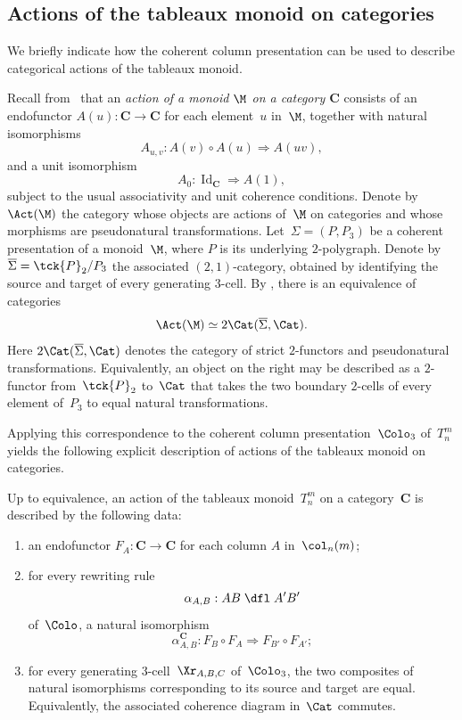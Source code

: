 \documentclass[a4paper, twoside, 11pt, english]{article}
\begin{document}
\subsection{Actions of the tableaux monoid on categories}
\label{SS:Actions}

We briefly indicate how the coherent column presentation can be used to
describe categorical actions of the tableaux monoid.

Recall from~\cite{GaussentGuiraudMalbos15} that an \emph{action of a monoid $\M$ on a category $\mathbf{C}$} consists of an endofunctor $A(u):\mathbf{C}\to\mathbf{C}$ for each element~$u$ in~$\M$, together with natural isomorphisms 
\[ 
A_{u,v}:A(v)\circ A(u)\Rightarrow A(uv), 
\] 
and a unit isomorphism
\[
A_0:\operatorname{Id}_{\mathbf C}\Rightarrow A(1),
\]
subject to the usual associativity and unit coherence conditions. Denote by~$\Act(\M)$ the category whose objects are actions
of~$\M$ on categories and whose morphisms are pseudonatural
transformations.
Let~$\Sigma=(P,P_3)$ be a coherent presentation of a monoid~$\M$, where
$P$ is its underlying $2$-polygraph. Denote by~$\overline{\Sigma}=\tck{P}_2/P_3$
the associated $(2,1)$-category, obtained by identifying the source and
target of every generating $3$-cell. By
\cite[Theorem~5.1.6]{GaussentGuiraudMalbos15}, there is an equivalence
of categories
\[
\Act(\M)\simeq 2\Cat(\overline{\Sigma},\Cat).
\]
Here $2\Cat(\overline{\Sigma},\Cat)$ denotes the category of strict $2$-functors and pseudonatural transformations.
Equivalently, an object on the right may be described as a $2$-functor
from~$\tck{P}_2$ to~$\Cat$ that takes the two boundary $2$-cells of every
element of~$P_3$ to equal natural transformations.

Applying this correspondence to the coherent column presentation~$\Colo_3$ of~$T_n^m$ yields the following explicit description of actions of the tableaux monoid on categories.

\begin{theorem}
\label{thm:actions}
Up to equivalence, an action of the tableaux monoid~$T_n^m$
on a category~$\mathbf C$ is described by the following data:
\begin{enumerate}[\bf i)]
\item an endofunctor $F_A:\mathbf C\to\mathbf C$ for each column
$A$ in~$\col_n(m)$;
\item for every rewriting rule
\[
\alpha_{A,B}:AB \;\dfl\; A'B'
\]
of~$\Colo$, a natural isomorphism
\[
\alpha_{A,B}^\mathbf{C}:
F_B\circ F_A
\Rightarrow
F_{B'}\circ F_{A'};
\]
\item for every generating $3$-cell~$\Xr_{A,B,C}$ of~$\Colo_3$, the
two composites of natural isomorphisms corresponding to its source and
target are equal. Equivalently, the associated coherence diagram in~$\Cat$ commutes.
\end{enumerate}
\end{theorem}
\end{document}
